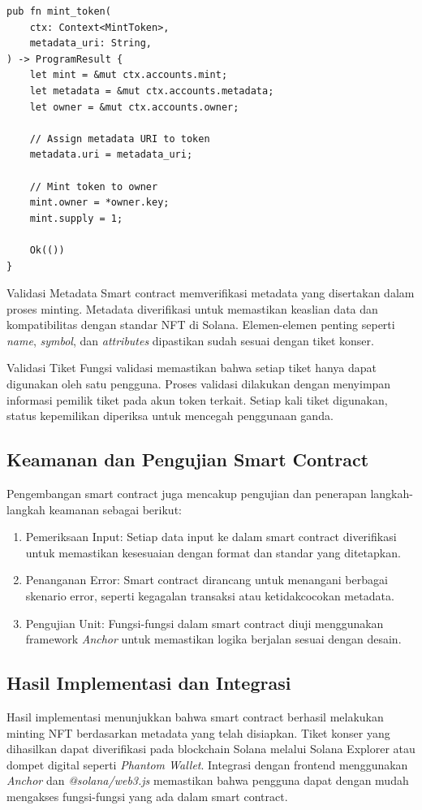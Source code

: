 \begin{verbatim}
pub fn mint_token(
    ctx: Context<MintToken>,
    metadata_uri: String,
) -> ProgramResult {
    let mint = &mut ctx.accounts.mint;
    let metadata = &mut ctx.accounts.metadata;
    let owner = &mut ctx.accounts.owner;

    // Assign metadata URI to token
    metadata.uri = metadata_uri;

    // Mint token to owner
    mint.owner = *owner.key;
    mint.supply = 1;

    Ok(())
}
\end{verbatim}

Validasi Metadata
Smart contract memverifikasi metadata yang disertakan dalam proses minting. Metadata diverifikasi untuk memastikan keaslian data dan kompatibilitas dengan standar NFT di Solana. Elemen-elemen penting seperti \textit{name}, \textit{symbol}, dan \textit{attributes} dipastikan sudah sesuai dengan tiket konser.

Validasi Tiket
Fungsi validasi memastikan bahwa setiap tiket hanya dapat digunakan oleh satu pengguna. Proses validasi dilakukan dengan menyimpan informasi pemilik tiket pada akun token terkait. Setiap kali tiket digunakan, status kepemilikan diperiksa untuk mencegah penggunaan ganda.

\subsection{Keamanan dan Pengujian Smart Contract}
Pengembangan smart contract juga mencakup pengujian dan penerapan langkah-langkah keamanan sebagai berikut:

\begin{enumerate}
    \item {Pemeriksaan Input}: Setiap data input ke dalam smart contract diverifikasi untuk memastikan kesesuaian dengan format dan standar yang ditetapkan.
    \item {Penanganan Error}: Smart contract dirancang untuk menangani berbagai skenario error, seperti kegagalan transaksi atau ketidakcocokan metadata.
    \item {Pengujian Unit}: Fungsi-fungsi dalam smart contract diuji menggunakan framework \textit{Anchor} untuk memastikan logika berjalan sesuai dengan desain.
\end{enumerate}

\subsection{Hasil Implementasi dan Integrasi}
Hasil implementasi menunjukkan bahwa smart contract berhasil melakukan minting NFT berdasarkan metadata yang telah disiapkan. Tiket konser yang dihasilkan dapat diverifikasi pada blockchain Solana melalui Solana Explorer atau dompet digital seperti \textit{Phantom Wallet}. Integrasi dengan frontend menggunakan \textit{Anchor} dan \textit{@solana/web3.js} memastikan bahwa pengguna dapat dengan mudah mengakses fungsi-fungsi yang ada dalam smart contract.

